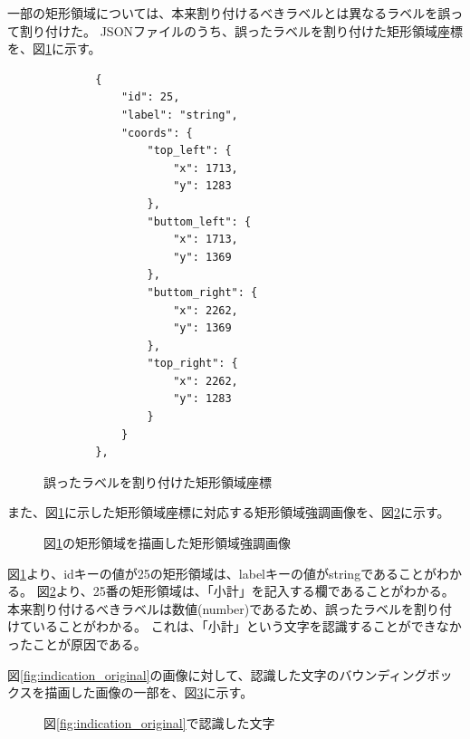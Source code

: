一部の矩形領域については、本来割り付けるべきラベルとは異なるラベルを誤って割り付けた。
JSONファイルのうち、誤ったラベルを割り付けた矩形領域座標を、図\ref{fig:rects_data_miss_json}に示す。
\lstset{language=}
\begin{figure}[tp]
    \begin{lstlisting}
        {
            "id": 25,
            "label": "string",
            "coords": {
                "top_left": {
                    "x": 1713,
                    "y": 1283
                },
                "buttom_left": {
                    "x": 1713,
                    "y": 1369
                },
                "buttom_right": {
                    "x": 2262,
                    "y": 1369
                },
                "top_right": {
                    "x": 2262,
                    "y": 1283
                }
            }
        },
    \end{lstlisting}
    \caption{誤ったラベルを割り付けた矩形領域座標}\label{fig:rects_data_miss_json}
\end{figure}
また、図\ref{fig:rects_data_miss_json}に示した矩形領域座標に対応する矩形領域強調画像を、図\ref{fig:highlighted_rects_miss_part}に示す。
\begin{figure}[tp]
    \begin{center}
        \caption{図\ref{fig:rects_data_miss_json}の矩形領域を描画した矩形領域強調画像}
        \label{fig:highlighted_rects_miss_part}
    \end{center}
\end{figure}
図\ref{fig:rects_data_miss_json}より、idキーの値が25の矩形領域は、labelキーの値がstringであることがわかる。
図\ref{fig:highlighted_rects_miss_part}より、25番の矩形領域は、「小計」を記入する欄であることがわかる。
本来割り付けるべきラベルは数値(number)であるため、誤ったラベルを割り付けていることがわかる。
これは、「小計」という文字を認識することができなかったことが原因である。

図\ref{fig:indication_original}の画像に対して、認識した文字のバウンディングボックスを描画した画像の一部を、図\ref{fig:OCR_result}に示す。
\begin{figure}[tp]
    \begin{center}
        \caption{図\ref{fig:indication_original}で認識した文字}
        \label{fig:OCR_result}
    \end{center}
\end{figure}

